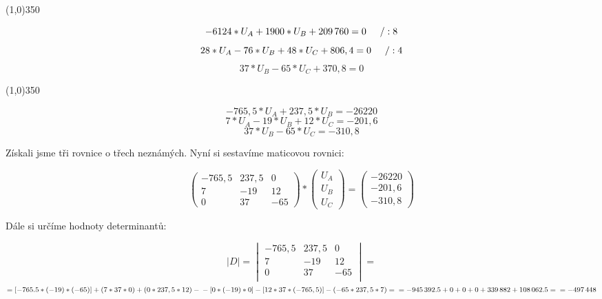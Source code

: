 \documentclass[a4paper]{article}
\begin{document}
\begin{center}
    \line(1,0){350}
\end{center}

\newpage

\[\num{-6 124} * U_A + \num{1 900} * U_B + \num{209 760} = 0 \hspace{5mm} /:8\]
\[28 * U_A - 76 * U_B + 48 * U_C + 806,4 = 0 \hspace{5mm} /:4\]
\[37 * U_B - 65 * U_C + 370,8 = 0\]

\begin{center}
    \line(1,0){350}
\end{center}

\[-765,5 * U_A + 237,5 * U_B = \num{-26 220}\]
\[7 * U_A - 19 * U_B + 12 * U_C = -201,6\]
\[37 * U_B - 65 * U_C = -310,8\]

\vspace{1cm}
\noindent
Získali jsme tři rovnice o třech neznámých. Nyní si sestavíme maticovou rovnici:

\begin{equation*}
\begin{pmatrix}
-765,5 & 237,5 & 0 \\
7 & -19 & 12 \\
0 & 37 & -65
\end{pmatrix}
*
\begin{pmatrix}
U_A \\
U_B \\
U_C
\end{pmatrix}
=
\begin{pmatrix}
\num{-26 220} \\
-201,6 \\
-310,8
\end{pmatrix}
\end{equation*}

\noindent
Dále si určíme hodnoty determinantů:

\begin{equation*}
|D| = 
   \begin{vmatrix} 
   -765,5 & 237,5 & 0  \\
   7 & -19 & 12  \\
   0 & 37 & -65  \\
   \end{vmatrix} 
=   
\end{equation*}
$= [-765.5 * (-19) * (-65)] + (7 * 37 * 0) + (0 * 237,5 * 12) -\\  
- [0 * (-19) * 0] - [12 * 37 * (-765,5)] - (-65 * 237,5 * 7) =\\
= \num{-945 392,5} + 0 + 0 + 0 + \num{339 882} + \num{108 062,5} =\\
= \num{-497 448}$
\end{document}
